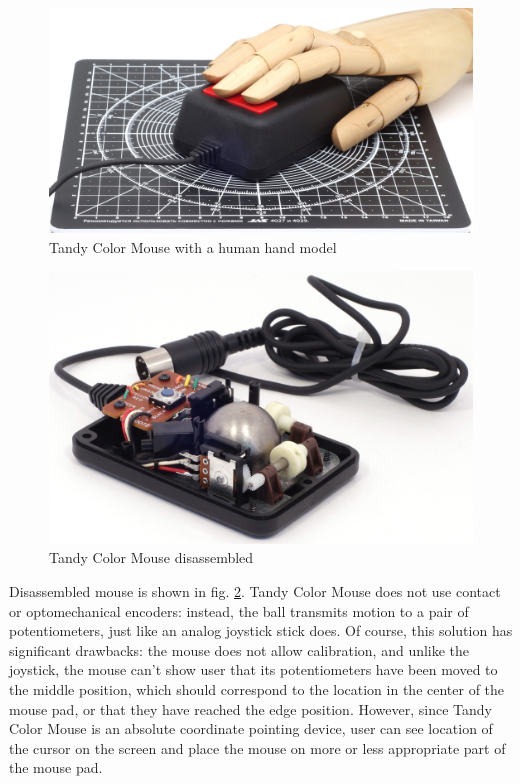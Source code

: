 \documentclass[11pt, a4paper]{article}
\begin{document}
\begin{figure}[h]
    \centering
    \includegraphics[scale=0.55]{1984_tandy_trs80_color_mouse/hand_30.jpg}
    \caption{Tandy Color Mouse with a human hand model}
    \label{fig:TandyColorMouseHand}
\end{figure}



\begin{figure}[h]
    \centering
    \includegraphics[scale=0.8]{1984_tandy_trs80_color_mouse/inside_30.jpg}
    \caption{Tandy Color Mouse disassembled}
    \label{fig:TandyColorMouseInside}
\end{figure}

Disassembled mouse is shown in fig. \ref{fig:TandyColorMouseInside}. Tandy Color Mouse does not use contact or optomechanical encoders: instead, the ball transmits motion to a pair of potentiometers, just like an analog joystick stick does. Of course, this solution has significant drawbacks: the mouse does not allow calibration, and unlike the joystick, the mouse can't show user that its potentiometers have been moved to the middle position, which should correspond to the location in the center of the mouse pad, or that they have reached the edge position. However, since Tandy Color Mouse is an absolute coordinate pointing device, user can see location of the cursor on the screen and place the mouse on more or less appropriate part of the mouse pad.
\end{document}
